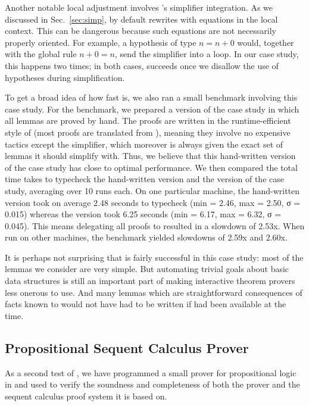 Another notable local adjustment involves \Aesop's simplifier integration. As we
discussed in Sec.~\ref{sec:simp}, \Aesop{} by default rewrites with equations in
the local context. This can be dangerous because such equations are not
necessarily properly oriented. For example, a hypothesis of type $n = n + 0$
would, together with the global rule $n + 0 = n$, send the simplifier into a
loop. In our case study, this happens two times; in both cases, \Aesop{}
succeeds once we disallow the use of hypotheses during simplification.

To get a broad idea of how fast \Aesop{} is, we also ran a small benchmark
involving this case study. For the benchmark, we prepared a version of the case
study in which all lemmas are proved by hand. The proofs are written in the
runtime-efficient style of \mathlib{} (most proofs are translated from
\Leanthree), meaning they involve no expensive tactics except the simplifier,
which moreover is always given the exact set of lemmas it should simplify with.
Thus, we believe that this hand-written version of the case study has close to
optimal performance. We then compared the total time \Lean{} takes to typecheck
the hand-written version and the \Aesop{} version of the case study, averaging
over 10 runs each. On one particular machine, the hand-written version took on
average 2.48 seconds to typecheck (min = 2.46, max = 2.50, σ = 0.015) whereas
the \Aesop{} version took 6.25 seconds (min = 6.17, max = 6.32, σ = 0.045). This
means delegating all proofs to \Aesop{} resulted in a slowdown of 2.53x. When
run on other machines, the benchmark yielded slowdowns of 2.59x and 2.60x.

It is perhaps not surprising that \Aesop{} is fairly successful in this case
study: most of the lemmas we consider are very simple. But automating trivial
goals about basic data structures is still an important part of making
interactive theorem provers less onerous to use. And many lemmas which are
straightforward consequences of facts known to \Lean{} would not have had to be
written if \Aesop{} had been available at the time.


\subsection{Propositional Sequent Calculus Prover}%
\label{sec:leanprover}

As a second test of \Aesop, we have programmed a small prover for propositional
logic~\cite{Villadsen20} in \Leanfour{} and used \Aesop{} to verify the
soundness and completeness of both the prover and the sequent calculus proof
system it is based on.

